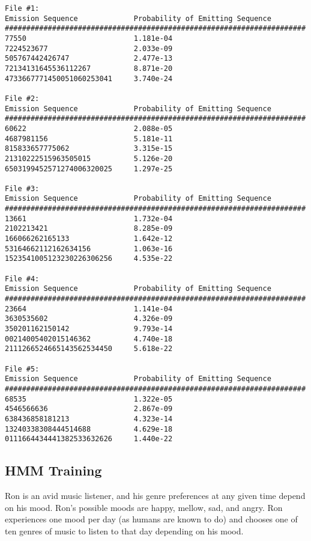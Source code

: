 \begin{solution}
\begin{verbatim}
File #1:
Emission Sequence             Probability of Emitting Sequence
######################################################################
77550                         1.181e-04 
7224523677                    2.033e-09 
505767442426747               2.477e-13 
72134131645536112267          8.871e-20 
4733667771450051060253041     3.740e-24 

File #2:
Emission Sequence             Probability of Emitting Sequence
######################################################################
60622                         2.088e-05 
4687981156                    5.181e-11 
815833657775062               3.315e-15 
21310222515963505015          5.126e-20 
6503199452571274006320025     1.297e-25 

File #3:
Emission Sequence             Probability of Emitting Sequence
######################################################################
13661                         1.732e-04 
2102213421                    8.285e-09 
166066262165133               1.642e-12 
53164662112162634156          1.063e-16 
1523541005123230226306256     4.535e-22 

File #4:
Emission Sequence             Probability of Emitting Sequence
######################################################################
23664                         1.141e-04 
3630535602                    4.326e-09 
350201162150142               9.793e-14 
00214005402015146362          4.740e-18 
2111266524665143562534450     5.618e-22 

File #5:
Emission Sequence             Probability of Emitting Sequence
######################################################################
68535                         1.322e-05 
4546566636                    2.867e-09 
638436858181213               4.323e-14 
13240338308444514688          4.629e-18 
0111664434441382533632626     1.440e-22 
\end{verbatim}
\end{solution}

\subsection{HMM Training}
Ron is an avid music listener, and his genre preferences at any given time depend on his mood. Ron's possible moods are happy, mellow, sad, and angry. Ron experiences one mood per day (as humans are known to do) and chooses one of ten genres of music to listen to that day depending on his mood. \\

